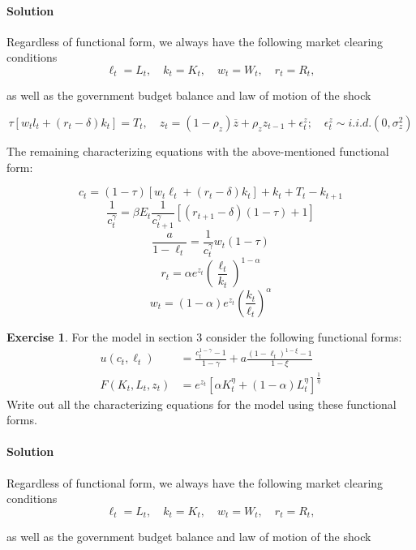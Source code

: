 \documentclass[letterpaper,12pt]{article}
\theoremstyle{definition}
\newtheorem{exercise}[theorem]{Exercise}
\begin{document}
\begin{spacing}{1.5}
\paragraph{Solution} Regardless of functional form, we always have the following market clearing conditions
$$\ell_t = L_t, \quad k_t = K_t, \quad w_t = W_t, \quad r_t = R_t ,$$

as well as the government budget balance and law of motion of the shock

$$ \tau [w_tl_t + (r_t - \delta)k_t] = T_t, \quad z_t = ( 1 - \rho_z )\overline{z} + \rho_z z_{t - 1} + \epsilon_t^z; \quad \epsilon_t^z \sim i.i.d.(0, \sigma_z^2)$$

The remaining characterizing equations with the above-mentioned functional form:

$$c_t = (1 - \tau)[w_t\ell_t + (r_t - \delta) k_t] + k_t + T_t - k_{t + 1} $$
$$\frac{1}{c_t^\gamma} = \beta E_t{\frac{1}{c_{t + 1}^\gamma} [ (r_{t + 1} -\delta)(1 - \tau) + 1]} $$
$$ \frac{a}{1 - \ell_t} = \frac{1}{c_t^\gamma} w_t (1 - \tau) $$
$$r_t = \alpha e^{z_t} (\frac{ \ell_t}{k_t})^{1 - \alpha} $$
$$w_t = (1 - \alpha) e^{z_t} (\frac{k_t}{\ell_t})^\alpha$$



	\begin{exercise} \label{DSGE_HW_CharEq_CES}
		For the model in section 3 consider the following functional forms:
		\begin{equation}\label{DSGE_HW_CharEq_CES_eq01}
		\begin{split}
		u(c_t,\ell_t) & = \frac{c^{1-\gamma}_t -1}{1-\gamma}+ a \frac{(1-\ell_t)^{1-\xi}-1}{1-\xi}      \\
		F(K_t,L_t,z_t) & = e^{z_t}\left[\alpha K^{\eta}_t +(1-\alpha)L^{\eta}_t \right]^{\frac{1}{\eta}}   \nonumber
		\end{split}
		\end{equation}
		Write out all the characterizing equations for the model using these functional forms.
	\end{exercise}

\paragraph{Solution} Regardless of functional form, we always have the following market clearing conditions
$$\ell_t = L_t, \quad k_t = K_t, \quad w_t = W_t, \quad r_t = R_t ,$$

as well as the government budget balance and law of motion of the shock


\end{spacing}
\end{document}
